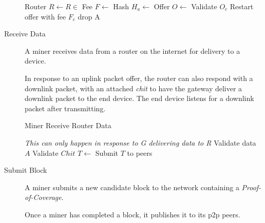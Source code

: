 \documentclass[10pt, nonatbib, nocopyrightspace, reprint]{sigplanconf}
\begin{document}
\begin{description}
\begin{algorithm}[!htb]
       {
        Router $R \leftarrow R \in $  \;
        Fee $F \leftarrow $  \;
        Hash $H_a \leftarrow $  \;
        Offer $O \leftarrow $  \;
         {
           {
            Validate $O_c$
             {
               {
                Restart offer with fee $F_c$\;
              }
               {
                drop A
              }
            }
          }
        }
      }
    \end{algorithm}
    \FloatBarrier


  \item [Receive Data] A miner receives data from a router on the internet for delivery to a device.

    In response to an uplink packet offer, the router can also respond with a downlink packet, with an attached \emph{chit} to have the gateway deliver a downlink packet to the end device. The end device listens for a downlink packet after transmitting.

    \begin{algorithm}[!htb]
      \DontPrintSemicolon
      \caption{Miner Receive Router Data}\label{proto:miner.data.receive}

       {
        \emph{This can only happen in response to G delivering data to R}
        Validate data $A$ \;
        Validate $Chit$\;
         \;
        $T \leftarrow $  \;
        Submit $T$ to peers\;
      }
    \end{algorithm}
    \FloatBarrier


  \item [Submit Block] A miner submits a new candidate block to the network containing a \emph{Proof-of-Coverage}.

    Once a miner has completed a block, it publishes it to its p2p peers.


\end{description}
\end{document}
